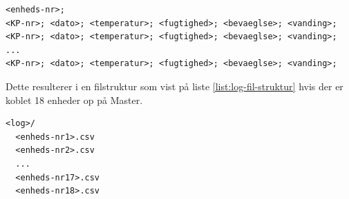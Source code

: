 \begin{lstlisting}[caption=Semikolon-separeret datafil til log af enheder, label={list:log-csv-struktur}]
<enheds-nr>;
<KP-nr>; <dato>; <temperatur>; <fugtighed>; <bevaeglse>; <vanding>;
<KP-nr>; <dato>; <temperatur>; <fugtighed>; <bevaeglse>; <vanding>;
...
<KP-nr>; <dato>; <temperatur>; <fugtighed>; <bevaeglse>; <vanding>;
\end{lstlisting}

Dette resulterer i en filstruktur som vist på liste \ref{list:log-fil-struktur} hvis der er koblet 18 enheder op på Master.

\begin{lstlisting}[caption=Filstruktur for logfiler på Master, label={list:log-fil-struktur}]
<log>/
  <enheds-nr1>.csv
  <enheds-nr2>.csv
  ...
  <enheds-nr17>.csv
  <enheds-nr18>.csv
\end{lstlisting}

